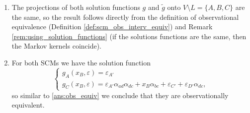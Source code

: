 \begin{enumerate}
\begin{gradedsolution}
\begin{enumerate}
	We see that $G(M_{\setminus L})$ is a subgraph of $G(M)^{\setminus L}$.
	\item \label{ans:obs_equiv} The projections of both solution functions $g$ and $\tilde{g}$ onto $V\setminus L = \{A, B, C\}$ are the same, so the result follows directly from the definition of observational equivalence (Definition \ref*{def:scm_obs_interv_equiv}) and Remark \ref*{rem:using_solution_functions} (if the solutions functions are the same, then the Markov kernels coincide).
	\item For both SCMs we have the solution function
	\[\begin{cases}
			g_A(x_B, \varepsilon) = \varepsilon_{A'} \\
			g_C(x_B, \varepsilon) = \varepsilon_{A'} \alpha_{ad} \alpha _{dc}+x_B \alpha _{bc}+\varepsilon_{C'}+\varepsilon_{D'} \alpha_{dc},
	\end{cases}\]
	so similar to \ref{ans:obs_equiv} we conclude that they are observationally equivalent.
\end{enumerate}
\end{gradedsolution}

\end{enumerate}


